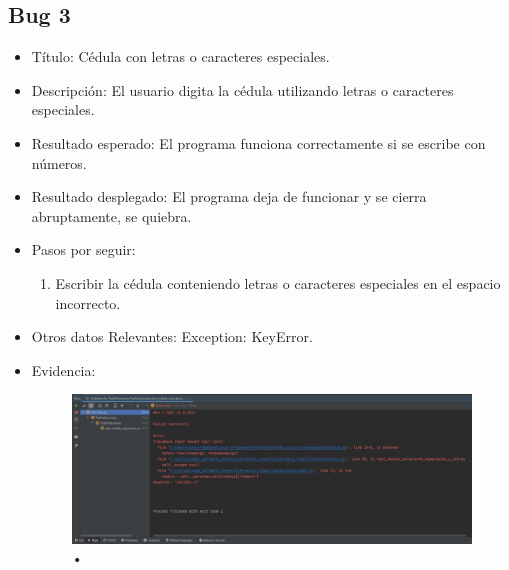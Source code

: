 \documentclass[conference]{IEEEtran}
\begin{document}
\subsection*{Bug 3}
\begin{itemize}
\item Título: Cédula con letras o caracteres especiales.

\item Descripción: El usuario digita la cédula utilizando letras o caracteres especiales.

\item Resultado esperado: El programa funciona correctamente si se escribe con números.

\item Resultado desplegado: El programa deja de funcionar y se cierra abruptamente, se quiebra. 

\item Pasos por seguir: 
\begin{enumerate}
\item Escribir la cédula conteniendo letras o caracteres especiales en el espacio incorrecto.
\end{enumerate}

\item Otros datos Relevantes: Exception: KeyError.
\item Evidencia:
\begin{figure}[H]
\centering
\includegraphics[scale=0.2]{imagenes/cedula_caracteres.jpeg}
\caption{•}
\end{figure}

\end{itemize}
\end{document}
